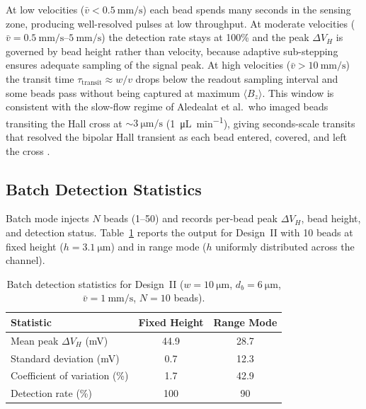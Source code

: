 \documentclass[micromachines,article,submit,pdftex,moreauthors]{Definitions/mdpi}
\begin{document}
At low velocities ($\bar{v} < \SI{0.5}{\milli\meter\per\second}$) each bead spends many
seconds in the sensing zone, producing well-resolved pulses at low throughput. At
moderate velocities ($\bar{v} = \SIrange{0.5}{5}{\milli\meter\per\second}$) the
detection rate stays at 100\% and the peak $\Delta V_H$ is governed by bead height
rather than velocity, because adaptive sub-stepping ensures adequate sampling of the
signal peak. At high velocities ($\bar{v} > \SI{10}{\milli\meter\per\second}$) the
transit time $\tau_\text{transit} \approx w/v$ drops below the readout sampling
interval and some beads pass without being captured at maximum $\langle B_z\rangle$.
This window is consistent with the slow-flow regime of Aledealat et al.\, who
imaged beads transiting the Hall cross at ${\sim}\SI{3}{\micro\meter\per\second}$
(\SI{1}{\micro\liter\per\minute}), giving seconds-scale transits that resolved the
bipolar Hall transient as each bead entered, covered, and left the cross
\cite{aledealat2009}.

\subsection{Batch Detection Statistics}
\label{sec:batch}

Batch mode injects $N$ beads (1--50) and records per-bead peak $\Delta V_H$, bead
height, and detection status. Table~\ref{tab:batch} reports the output for Design~II
with 10 beads at fixed height ($h = \SI{3.1}{\micro\meter}$) and in range mode
($h$ uniformly distributed across the channel).

\begin{table}[H]
\caption{Batch detection statistics for Design~II ($w = \SI{10}{\micro\meter}$,
$d_b = \SI{6}{\micro\meter}$, $\bar{v} = \SI{1}{\milli\meter\per\second}$,
$N = 10$ beads).\label{tab:batch}}
\begin{tabularx}{\textwidth}{Xcc}
\toprule
\textbf{Statistic} & \textbf{Fixed Height} & \textbf{Range Mode} \\
\midrule
Mean peak $\Delta V_H$ (mV)      & 44.9 & 28.7 \\
Standard deviation (mV)          & 0.7  & 12.3 \\
Coefficient of variation (\%)    & 1.7  & 42.9 \\
Detection rate (\%)              & 100  & 90 \\
\bottomrule
\end{tabularx}
\end{table}
\end{document}
